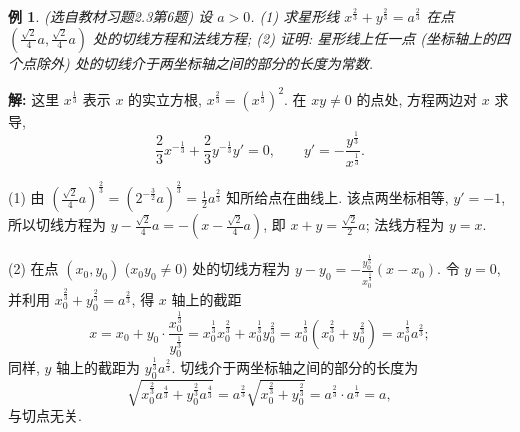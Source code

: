 \documentclass[UTF8,openany]{ctexbook}
\theoremstyle{chinesetextbook}
\newtheorem{example}{例}[section]
\newenvironment{cnsolution}{\par\indent\textbf{解:} \ignorespaces}{\par}
\begin{document}
\begin{example}\label{ex:c2-h3-6}
\textnormal{(选自教材习题2.3第6题)} 设 $a>0$. (1) 求星形线 $x^{\frac23}+y^{\frac23}=a^{\frac23}$ 在点 $\displaystyle\left(\frac{\sqrt2}4a,\frac{\sqrt2}4a\right)$ 处的切线方程和法线方程; (2) 证明: 星形线上任一点 (坐标轴上的四个点除外) 处的切线介于两坐标轴之间的部分的长度为常数.
\end{example}
\begin{cnsolution}
这里 $x^{\frac13}$ 表示 $x$ 的实立方根, $x^{\frac23}=\left(x^{\frac13}\right)^2$. 在 $xy\ne0$ 的点处, 方程两边对 $x$ 求导,
\[
\frac23x^{-\frac13}+\frac23y^{-\frac13}y'=0,\qquad y'=-\frac{y^{\frac13}}{x^{\frac13}}.
\]

(1) 由 $\displaystyle\left(\frac{\sqrt2}4a\right)^{\frac23}=\left(2^{-\frac32}a\right)^{\frac23}=\frac12a^{\frac23}$ 知所给点在曲线上. 该点两坐标相等, $y'=-1$, 所以切线方程为 $\displaystyle y-\frac{\sqrt2}4a=-\left(x-\frac{\sqrt2}4a\right)$, 即 $\displaystyle x+y=\frac{\sqrt2}2a$; 法线方程为 $y=x$.

(2) 在点 $(x_0,y_0)$ ($x_0y_0\ne0$) 处的切线方程为 $\displaystyle y-y_0=-\frac{y_0^{\frac13}}{x_0^{\frac13}}(x-x_0)$. 令 $y=0$, 并利用 $x_0^{\frac23}+y_0^{\frac23}=a^{\frac23}$, 得 $x$ 轴上的截距
\[
x=x_0+y_0\cdot\frac{x_0^{\frac13}}{y_0^{\frac13}}=x_0^{\frac13}x_0^{\frac23}+x_0^{\frac13}y_0^{\frac23}=x_0^{\frac13}\left(x_0^{\frac23}+y_0^{\frac23}\right)=x_0^{\frac13}a^{\frac23};
\]
同样, $y$ 轴上的截距为 $y_0^{\frac13}a^{\frac23}$. 切线介于两坐标轴之间的部分的长度为
\[
\sqrt{x_0^{\frac23}a^{\frac43}+y_0^{\frac23}a^{\frac43}}=a^{\frac23}\sqrt{x_0^{\frac23}+y_0^{\frac23}}=a^{\frac23}\cdot a^{\frac13}=a,
\]
与切点无关.
\end{cnsolution}
\end{document}
